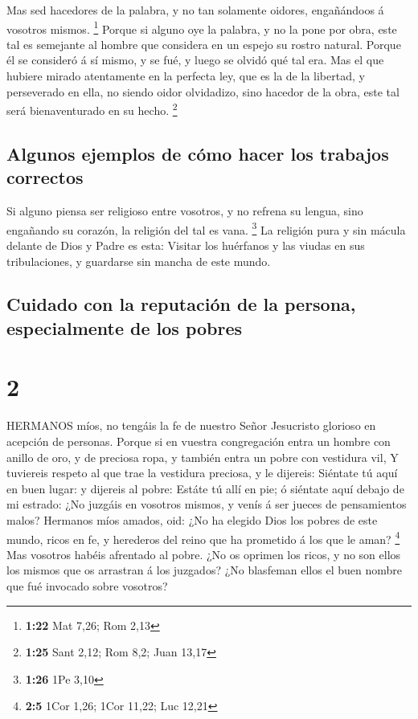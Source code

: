 Mas sed hacedores de la palabra, y no tan solamente
oidores, engañándoos á vosotros mismos. \footnote{\textbf{1:22} Mat
  7,26; Rom 2,13}  Porque si alguno oye la palabra, y no la
pone por obra, este tal es semejante al hombre que considera en un
espejo su rostro natural.  Porque él se consideró á sí
mismo, y se fué, y luego se olvidó qué tal era.  Mas el que
hubiere mirado atentamente en la perfecta ley, que es la de la libertad,
y perseverado en ella, no siendo oidor olvidadizo, sino hacedor de la
obra, este tal será bienaventurado en su hecho. \footnote{\textbf{1:25}
  Sant 2,12; Rom 8,2; Juan 13,17}

\hypertarget{algunos-ejemplos-de-cuxf3mo-hacer-los-trabajos-correctos}{%
\subsection{Algunos ejemplos de cómo hacer los trabajos
correctos}\label{algunos-ejemplos-de-cuxf3mo-hacer-los-trabajos-correctos}}

 Si alguno piensa ser religioso entre vosotros, y no
refrena su lengua, sino engañando su corazón, la religión del tal es
vana. \footnote{\textbf{1:26} 1Pe 3,10}  La religión pura y
sin mácula delante de Dios y Padre es esta: Visitar los huérfanos y las
viudas en sus tribulaciones, y guardarse sin mancha de este mundo.

\hypertarget{cuidado-con-la-reputaciuxf3n-de-la-persona-especialmente-de-los-pobres}{%
\subsection{Cuidado con la reputación de la persona, especialmente de
los
pobres}\label{cuidado-con-la-reputaciuxf3n-de-la-persona-especialmente-de-los-pobres}}

\hypertarget{section-1}{%
\section{2}\label{section-1}}

 HERMANOS míos, no tengáis la fe de nuestro Señor Jesucristo
glorioso en acepción de personas.  Porque si en vuestra
congregación entra un hombre con anillo de oro, y de preciosa ropa, y
también entra un pobre con vestidura vil,  Y tuviereis
respeto al que trae la vestidura preciosa, y le dijereis: Siéntate tú
aquí en buen lugar: y dijereis al pobre: Estáte tú allí en pie; ó
siéntate aquí debajo de mi estrado:  ¿No juzgáis en vosotros
mismos, y venís á ser jueces de pensamientos malos? 
Hermanos míos amados, oid: ¿No ha elegido Dios los pobres de este mundo,
ricos en fe, y herederos del reino que ha prometido á los que le aman?
\footnote{\textbf{2:5} 1Cor 1,26; 1Cor 11,22; Luc 12,21} 
Mas vosotros habéis afrentado al pobre. ¿No os oprimen los ricos, y no
son ellos los mismos que os arrastran á los juzgados?  ¿No
blasfeman ellos el buen nombre que fué invocado sobre vosotros?

